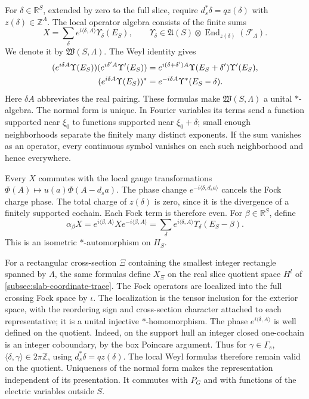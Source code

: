 \documentclass[11pt,letterpaper,reqno]{amsart}
\newcommand{\R}{\mathbb R}
\newcommand{\Z}{\mathbb Z}
\begin{document}
For $\delta\in\R^S$, extended by zero to the full slice, require
$d_s^*\delta=qz(\delta)$ with $z(\delta)\in\Z^\Lambda$. The local
operator algebra consists of the finite sums
\begin{equation}\label{eq:diag-operator-normal-form}
 X=\sum_\delta e^{i\langle\delta,A\rangle}\Upsilon_\delta(E_S),
 \qquad\Upsilon_\delta\in\mathfrak A(S)\otimes
                      \operatorname{End}_{z(\delta)}(\mathcal F_\Lambda).
\end{equation}
We denote it by $\mathfrak W(S,\Lambda)$. The Weyl identity gives
\begin{align}\label{eq:diag-operator-rules}
 (e^{i\delta A}\Upsilon(E_S))(e^{i\delta'A}\Upsilon'(E_S))
       &=e^{i(\delta+\delta')A}\Upsilon(E_S+\delta')\Upsilon'(E_S),
          \notag\\
 (e^{i\delta A}\Upsilon(E_S))^*
       &=e^{-i\delta A}\Upsilon^*(E_S-\delta).
\end{align}
Here $\delta A$ abbreviates the real pairing. These formulas make
$\mathfrak W(S,\Lambda)$ a unital $*$-algebra. The normal form is
unique. In Fourier variables its terms send a function supported
near $\xi_0$ to functions supported near $\xi_0+\delta$; small
enough neighborhoods separate the finitely many distinct exponents.
If the sum vanishes as an operator, every continuous symbol vanishes
on each such neighborhood and hence everywhere.

Every $X$ commutes with the local gauge transformations
$\Phi(A)\mapsto u(a)\Phi(A-d_sa)$. The phase change
$e^{-i\langle\delta,d_sa\rangle}$ cancels the Fock charge phase.
The total charge of $z(\delta)$ is zero, since it is the divergence
of a finitely supported cochain. Each Fock term is therefore even.
For $\beta\in\R^S$, define
\begin{equation}\label{eq:diag-alpha}
 \alpha_\beta X=e^{i\langle\beta,A\rangle}Xe^{-i\langle\beta,A\rangle}
    =\sum_\delta e^{i\langle\delta,A\rangle}
                                      \Upsilon_\delta(E_S-\beta).
\end{equation}
This is an isometric $*$-automorphism on $H_S$.

For a rectangular cross-section $\Xi$ containing the smallest integer
rectangle spanned by $\Lambda$,
the same formulas define $X_\Xi$ on the real slice quotient space
$H^l$ of \cref{subsec:slab-coordinate-trace}. The Fock operators
are localized into the full crossing Fock space by $\iota$.
The localization is the tensor inclusion for the exterior space, with the reordering
sign and cross-section character attached to each representative;
it is a unital injective $*$-homomorphism. The phase
$e^{i\langle\delta,A\rangle}$ is well defined on the quotient.
Indeed, on the support hull an integer closed one-cochain is an
integer coboundary, by the box Poincare argument. Thus for
$\gamma\in\Gamma_s$,
$\langle\delta,\gamma\rangle\in2\pi\Z$, using
$d_s^*\delta=qz(\delta)$. The local Weyl formulas therefore remain
valid on the quotient. Uniqueness of the normal form makes the
representation independent of its presentation. It commutes with
$P_G$ and with functions of the electric variables outside $S$.
\end{document}
